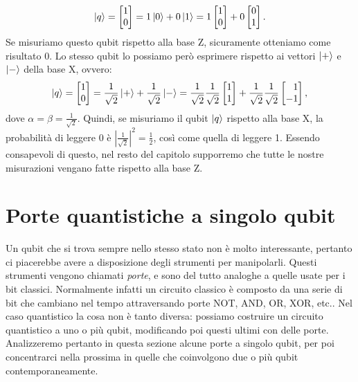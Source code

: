 \documentclass{book}
\theoremstyle{definition}
\theoremstyle{definition}
\theoremstyle{definition}
\theoremstyle{plain}
\theoremstyle{plain}
\theoremstyle{plain}
\theoremstyle{plain}
\begin{document}
\begin{displaymath}
    \ket{q} =
    \begin{bmatrix}
    1\\
    0
    \end{bmatrix} = 
    1 \ket{0} + 0 \ket{1} = 1 
    \begin{bmatrix}
    1\\
    0
    \end{bmatrix} + 0 
    \begin{bmatrix}
    0\\
    1
    \end{bmatrix}.
\end{displaymath}
Se misuriamo questo qubit rispetto alla base Z, sicuramente otteniamo come risultato 0. Lo stesso qubit lo possiamo però esprimere rispetto ai vettori $\ket{+}$ e $\ket{-}$ della base X, ovvero:
\begin{displaymath}
    \ket{q} =
    \begin{bmatrix}
    1\\
    0
    \end{bmatrix} = 
    \frac{1}{\sqrt{2}} \ket{+} + \frac{1}{\sqrt{2}} \ket{-} = 
    \frac{1}{\sqrt{2}} \frac{1}{\sqrt{2}} 
    \begin{bmatrix}
    1\\
    1
    \end{bmatrix} + 
    \frac{1}{\sqrt{2}} \frac{1}{\sqrt{2}} 
    \begin{bmatrix*}[r]
    1\\
    -1
    \end{bmatrix*},
\end{displaymath}
dove $\alpha = \beta = \frac{1}{\sqrt{2}}$. Quindi, se misuriamo il qubit $\ket{q}$ rispetto alla base X, la probabilità di leggere 0 è $\left\lvert \frac{1}{\sqrt{2}} \right\rvert^{2} = \frac{1}{2}$, così come quella di leggere 1. Essendo consapevoli di questo, nel resto del capitolo supporremo che tutte le nostre misurazioni vengano fatte rispetto alla base Z.

\section{Porte quantistiche a singolo qubit}
Un qubit che si trova sempre nello stesso stato non è molto interessante, pertanto ci piacerebbe avere a disposizione degli strumenti per manipolarli. Questi strumenti vengono chiamati \emph{porte}, e sono del tutto analoghe a quelle usate per i bit classici. Normalmente infatti un circuito classico è composto da una serie di bit che cambiano nel tempo attraversando porte NOT, AND, OR, XOR, etc.. Nel caso quantistico la cosa non è tanto diversa: possiamo costruire un circuito quantistico a uno o più qubit, modificando poi questi ultimi con delle porte. Analizzeremo pertanto in questa sezione alcune porte a singolo qubit, per poi concentrarci nella prossima in quelle che coinvolgono due o più qubit contemporaneamente.
\end{document}

